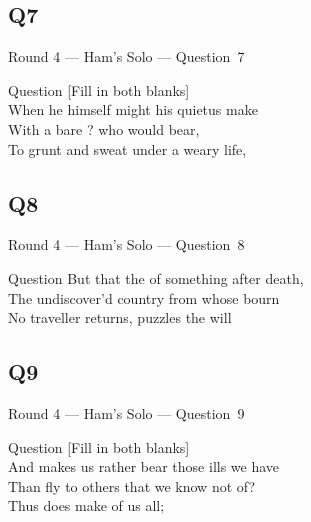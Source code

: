 \documentclass[11pt]{beamer}
\begin{document}
\subsection*{Q7}
\begin{frame}[t]{Round 4 --- Ham's Solo --- \mbox{Question 7}}
\vspace{-0.5em}
\begin{block}{Question}
[Fill in both blanks]\\
When he himself might his quietus make\\
With a bare \textunderscore{}\textunderscore{}\textunderscore{}\textunderscore{}\textunderscore{}? who would \textunderscore{}\textunderscore{}\textunderscore{}\textunderscore{}\textunderscore{} bear,\\
To grunt and sweat under a weary life,
\end{block}
\end{frame}
\subsection*{Q8}
\begin{frame}[t]{Round 4 --- Ham's Solo --- \mbox{Question 8}}
\vspace{-0.5em}
\begin{block}{Question}
But that the \textunderscore{}\textunderscore{}\textunderscore{}\textunderscore{}\textunderscore{} of something after death,\\
The undiscover'd country from whose bourn\\
No traveller returns, puzzles the will
\end{block}
\end{frame}
\subsection*{Q9}
\begin{frame}[t]{Round 4 --- Ham's Solo --- \mbox{Question 9}}
\vspace{-0.5em}
\begin{block}{Question}
[Fill in both blanks]\\
And makes us rather bear those ills we have\\
Than fly to others that we know not of?\\
Thus \textunderscore{}\textunderscore{}\textunderscore{}\textunderscore{}\textunderscore{} does make \textunderscore{}\textunderscore{}\textunderscore{}\textunderscore{}\textunderscore{} of us all;
\end{block}
\end{frame}
\end{document}
